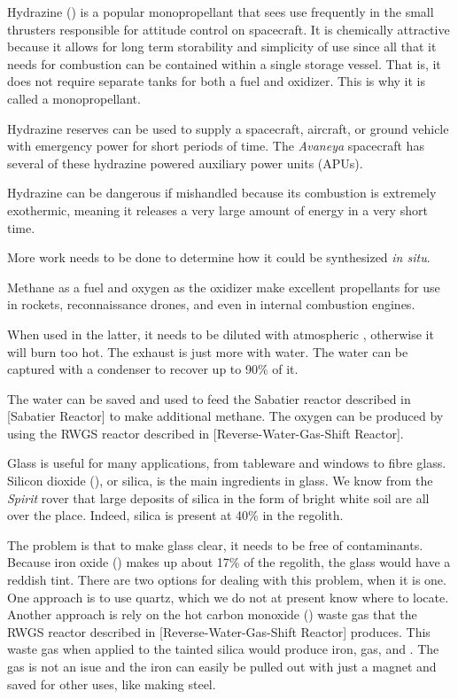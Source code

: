 Hydrazine () is a popular monopropellant that sees use frequently in the small thrusters responsible for attitude control on spacecraft. It is chemically attractive because it allows for long term storability and simplicity of use since all that it needs for combustion can be contained within a single storage vessel. That is, it does not require separate tanks for both a fuel and oxidizer. This is why it is called a monopropellant. 

Hydrazine reserves can be used to supply a spacecraft, aircraft, or ground vehicle with emergency power for short periods of time. The {\it Avaneya} spacecraft has several of these hydrazine powered auxiliary power units (APUs).

Hydrazine can be dangerous if mishandled because its combustion is extremely exothermic, meaning it releases a very large amount of energy in a very short time.

More work needs to be done to determine how it could be synthesized {\it in situ}.

Methane as a fuel and oxygen as the oxidizer make excellent propellants for use in rockets, reconnaissance drones, and even in internal combustion engines. 

When used in the latter, it needs to be diluted with atmospheric , otherwise it will burn too hot. The exhaust is just more  with water. The water can be captured with a condenser to recover up to 90\% of it. 

The water can be saved and used to feed the Sabatier reactor described in [Sabatier Reactor] to make additional methane. The oxygen can be produced by using the RWGS reactor described in [Reverse-Water-Gas-Shift Reactor].

Glass is useful for many applications, from tableware and windows to fibre glass. Silicon dioxide (), or silica, is the main ingredients in glass. We know from the {\it Spirit} rover that large deposits of silica in the form of bright white soil are all over the place. Indeed, silica is present at 40\% in the regolith. 

The problem is that to make glass clear, it needs to be free of contaminants. Because iron oxide () makes up about 17\% of the regolith, the glass would have a reddish tint. There are two options for dealing with this problem, when it is one. One approach is to use quartz, which we do not at present know where to locate. Another approach is rely on the hot carbon monoxide () waste gas that the RWGS reactor described in [Reverse-Water-Gas-Shift Reactor] produces. This waste gas when applied to the tainted silica would produce iron,  gas, and . The gas is not an isue and the iron can easily be pulled out with just a magnet and saved for other uses, like making steel.

